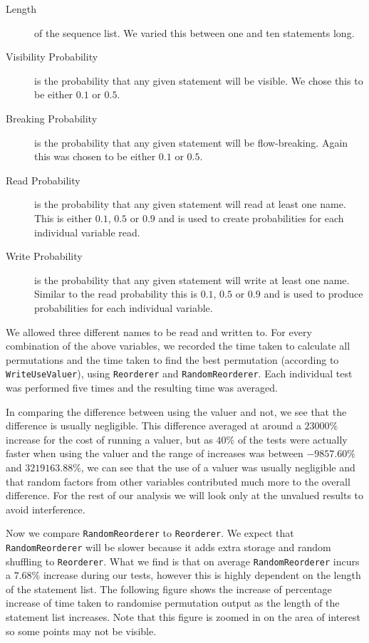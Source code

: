 \documentclass[twoside,a4paper]{report}
\begin{document}
\begin{description}
\item[Length] of the sequence list. We varied this between one and ten statements long.
\item[Visibility Probability] is the probability that any given statement will be visible. We chose this to be either $0.1$ or $0.5$.
\item[Breaking Probability] is the probability that any given statement will be flow-breaking. Again this was chosen to be either $0.1$ or $0.5$.
\item[Read Probability] is the probability that any given statement will read at least one name. This is either $0.1$, $0.5$ or $0.9$ and is used to create
probabilities for each individual variable read.
\item[Write Probability] is the probability that any given statement will write at least one name. Similar to the read probability this is $0.1$, $0.5$ or $0.9$ and
is used to produce probabilities for each individual variable.
\end{description}

We allowed three different names to be read and written to. For every combination of the above variables, we recorded the time taken to calculate all
permutations and the time taken to find the best permutation (according to \texttt{WriteUseValuer}), using \texttt{Reorderer} and \texttt{RandomReorderer}.
Each individual test was performed five times and the resulting time was averaged.

In comparing the difference between using the valuer and not, we see that the difference is usually negligible. This difference averaged at around a $23000\%$
increase for the cost of running a valuer, but as $40\%$ of the tests were actually faster when using the valuer and the range of increases was between
$-9857.60\%$ and $3219163.88\%$, we can see that the use of a valuer was usually negligible and that random factors from other variables contributed much more to
the overall difference. For the rest of our analysis we will look only at the unvalued results to avoid interference.

Now we compare \texttt{RandomReorderer} to \texttt{Reorderer}. We expect that \texttt{RandomReorderer} will be slower because it adds extra storage and random
shuffling to \texttt{Reorderer}. What we find is that on average \texttt{RandomReorderer} incurs a $7.68\%$ increase during our tests, however this is highly
dependent on the length of the statement list. The following figure shows the increase of percentage increase of time taken to randomise permutation output
as the length of the statement list increases. Note that this figure is zoomed in on the area of interest so some points may not be visible.
\end{document}

